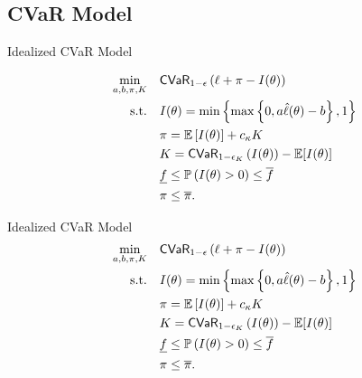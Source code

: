 \documentclass{beamer}
\begin{document}
\subsection{CVaR Model}
\begin{frame}{Idealized CVaR Model}
\label{ideal-model}
 
\begin{align}
    \min_{a,b,\pi, K}  & \quad {\sf CVaR}_{1-\epsilon}\left ( \ell + \pi - I(\theta) \right ) \nonumber \\
    \text{s.t.} & \quad I(\theta) =  \min \left \{\max \left \{0,a\hat{\ell}(\theta) - b \right \}, 1 \right \}\\
    & \quad \pi = \mathbb{E}\left [ I(\theta) \right ] + c_{\kappa} K \\
    & \quad K = {\sf CVaR}_{1-\epsilon_K}\left ( I(\theta)\right )  - \mathbb{E}[I(\theta)] \\
    & \quad \underline{f} \leq \mathbb{P}\left ( I(\theta) > 0 \right ) \leq \overline{f}\\
    &\quad \pi \leq \overline{\pi}.
\end{align}
\end{frame}

\begin{frame}[noframenumbering]{Idealized CVaR Model}
    \label{ideal-model}
    \begin{align}
        \min_{a,b,\pi, K}  & \quad {\sf CVaR}_{1-\epsilon}\left ( \ell + \pi - I(\theta) \right ) \nonumber \\
        \text{s.t.} & \quad I(\theta) =  \min \left \{\max \left \{0,a\hat{\ell}(\theta) - b \right \}, 1 \right \}\\
        & \quad \pi = \mathbb{E}\left [ I(\theta) \right ] + c_{\kappa} K \\
        & \quad K = {\sf CVaR}_{1-\epsilon_K}\left ( I(\theta)\right )  - \mathbb{E}[I(\theta)] \\
        & \quad \underline{f} \leq \mathbb{P}\left ( I(\theta) > 0 \right ) \leq \overline{f}\\
        &\quad \pi \leq \overline{\pi}.
    \end{align}
    \end{frame}
\end{document}
